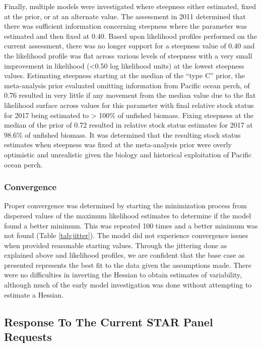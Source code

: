 \documentclass[12pt,]{article}
\begin{document}
Finally, multiple models were investigated where steepness either
estimated, fixed at the prior, or at an alternate value. The assessment
in 2011 determined that there was sufficient information concerning
steepness where the parameter was estimated and then fixed at 0.40.
Based upon likelihood profiles performed on the current assessment,
there was no longer support for a steepness value of 0.40 and the
likelihood profile was flat across various levels of steepness with a
very small improvement in likelihood (\textless{}0.50 log likelihood
units) at the lowest steepness values. Estimating steepness starting at
the median of the ``type C'' prior, the meta-analysis prior evaluated
omitting information from Pacific ocean perch, of 0.76 resulted in very
little if any movement from the median value due to the flat likelihood
surface across values for this parameter with final relative stock
status for 2017 being estimated to \textgreater{} 100\% of unfished
biomass. Fixing steepness at the median of the prior of 0.72 resulted in
relative stock status estimates for 2017 at 98.6\% of unfished biomass.
It was determined that the resulting stock status estimates when
steepness was fixed at the meta-analysis prior were overly optimistic
and unrealistic given the biology and historical exploitation of Pacific
ocean perch.

\subsubsection{Convergence}\label{convergence}

Proper convergence was determined by starting the minimization process
from dispersed values of the maximum likelihood estimates to determine
if the model found a better minimum. This was repeated 100 times and a
better minimum was not found (Table \ref{tab:jitter}). The model did not
experience convergence issues when provided reasonable starting values.
Through the jittering done as explained above and likelihood profiles,
we are confident that the base case as presented represents the best fit
to the data given the assumptions made. There were no difficulties in
inverting the Hessian to obtain estimates of variability, although much
of the early model investigation was done without attempting to estimate
a Hessian.

\subsection{Response To The Current STAR Panel
Requests}\label{response-to-the-current-star-panel-requests}
\end{document}
